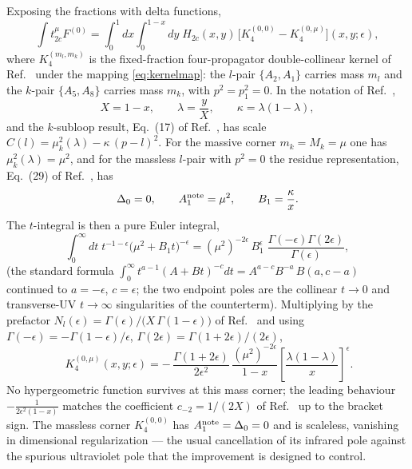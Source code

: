 \documentclass[11pt]{article}
\newcommand{\eps}{\epsilon}
\begin{document}
Exposing the fractions with delta functions,
\begin{equation}
\int t^{\mu}_{2c}F^{(0)}
=\int_0^1\!dx\int_0^{1-x}\!dy\;H_{2c}(x,y)\,
\Big[K_4^{(0,0)}-K_4^{(0,\mu)}\Big](x,y;\eps),
\end{equation}
where $K_4^{(m_l,m_k)}$ is the fixed-fraction four-propagator double-collinear kernel of
Ref.~\cite{kernel} under the mapping \eqref{eq:kernelmap}: the $l$-pair $\{A_2,A_1\}$ carries mass
$m_l$ and the $k$-pair $\{A_5,A_8\}$ carries mass $m_k$, with $p^2=p_1^2=0$. In the notation of
Ref.~\cite{kernel},
\begin{equation}
X=1-x,\qquad
\lambda=\frac{y}{X},\qquad
\kappa=\lambda(1-\lambda),
\end{equation}
and the $k$-subloop result, Eq.~(17) of Ref.~\cite{kernel}, has scale
$C(l)=\mu_k^2(\lambda)-\kappa\,(p-l)^2$. For the massive corner $m_k=M_k=\mu$ one has
$\mu_k^2(\lambda)=\mu^2$, and for the massless $l$-pair with $p^2=0$ the residue representation,
Eq.~(29) of Ref.~\cite{kernel}, has
\begin{equation}
\Delta_0=0,
\qquad
A_1^{\rm note}=\mu^2,
\qquad
B_1=\frac{\kappa}{x} .
\end{equation}
The $t$-integral is then a pure Euler integral,
\begin{equation}
\int_0^\infty dt\;t^{-1-\eps}\big(\mu^2+B_1 t\big)^{-\eps}
=(\mu^2)^{-2\eps}\,B_1^{\eps}\;\frac{\Gamma(-\eps)\Gamma(2\eps)}{\Gamma(\eps)} ,
\end{equation}
(the standard formula $\int_0^\infty t^{a-1}(A+Bt)^{-c}dt=A^{a-c}B^{-a}\,B(a,c-a)$ continued to
$a=-\eps$, $c=\eps$; the two endpoint poles are the collinear $t\to0$ and transverse-UV
$t\to\infty$ singularities of the counterterm). Multiplying by the prefactor
$N_l(\eps)=\Gamma(\eps)/\big(X\,\Gamma(1-\eps)\big)$ of Ref.~\cite{kernel} and using
$\Gamma(-\eps)=-\Gamma(1-\eps)/\eps$, $\Gamma(2\eps)=\Gamma(1+2\eps)/(2\eps)$,
\begin{equation}
\boxed{\;
K_4^{(0,\mu)}(x,y;\eps)
=-\,\frac{\Gamma(1+2\eps)}{2\eps^{2}}\,
\frac{(\mu^{2})^{-2\eps}}{1-x}
\left[\frac{\lambda(1-\lambda)}{x}\right]^{\eps} .}
\label{eq:K4}
\end{equation}
No hypergeometric function survives at this mass corner; the leading behaviour
$-\tfrac{1}{2\eps^2(1-x)}$ matches the coefficient $c_{-2}=1/(2X)$ of Ref.~\cite{kernel} up to the
bracket sign. The massless corner $K_4^{(0,0)}$ has $A_1^{\rm note}=\Delta_0=0$ and is scaleless,
vanishing in dimensional regularization --- the usual cancellation of its infrared pole against
the spurious ultraviolet pole that the improvement is designed to control.
\end{document}

